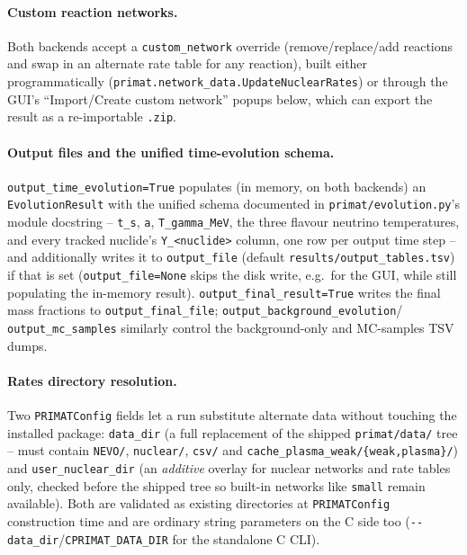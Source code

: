 \documentclass[11pt,a4paper]{article}
\newcommand{\code}[1]{\texttt{#1}}
\begin{document}
\paragraph{Custom reaction networks.}\label{sec:custom-networks}
Both backends accept a \code{custom\_network} override (remove/replace/add
reactions and swap in an alternate rate table for any reaction), built either
programmatically (\code{primat.network\_data.UpdateNuclearRates}) or through
the GUI's ``Import/Create custom network'' popups below, which can export the
result as a re-importable \code{.zip}.

\paragraph{Output files and the unified time-evolution schema.}
\code{output\_time\_evolution=True} populates (in memory, on both backends)
an \code{EvolutionResult} with the unified schema documented in
\code{primat/evolution.py}'s module docstring -- \code{t\_s}, \code{a},
\code{T\_gamma\_MeV}, the three flavour neutrino temperatures, and every
tracked nuclide's \code{Y\_<nuclide>} column, one row per output time step --
and additionally writes it to \code{output\_file} (default
\code{results/output\_tables.tsv}) if that is set (\code{output\_file=None}
skips the disk write, e.g.\ for the GUI, while still populating the
in-memory result). \code{output\_final\_result=True} writes the final mass
fractions to \code{output\_final\_file}; \code{output\_background\_evolution}/
\code{output\_mc\_samples} similarly control the background-only and
MC-samples TSV dumps.

\paragraph{Rates directory resolution.}
Two \code{PRIMATConfig} fields let a run substitute alternate data without
touching the installed package: \code{data\_dir} (a full replacement of the
shipped \code{primat/data/} tree -- must contain \code{NEVO/},
\code{nuclear/}, \code{csv/} and
\code{cache\_plasma\_weak/\{weak,plasma\}/}) and \code{user\_nuclear\_dir}
(an \emph{additive} overlay for nuclear networks and rate tables only,
checked before the shipped tree so built-in networks like \code{small}
remain available). Both are validated as existing directories at
\code{PRIMATConfig} construction time and are ordinary string parameters on
the C side too (\code{-{}-data\_dir}/\code{CPRIMAT\_DATA\_DIR} for the
standalone C CLI).
\end{document}
